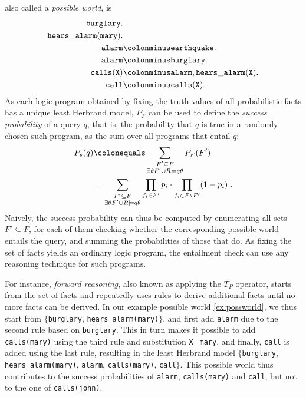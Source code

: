 \documentclass[a4paper]{article}
\begin{document}
also called a \emph{possible world}, is 
\begin{align}
\mathtt{burglary.}&\nonumber\\
\mathtt{hears\_alarm(mary).}& \nonumber\\
\mathtt{alarm}&\colonminus\mathtt{earthquake.}\label{ex:possworld}\\
\mathtt{alarm}&\colonminus\mathtt{burglary.}\nonumber\\
\mathtt{calls(X)}&\colonminus\mathtt{alarm, hears\_alarm(X).}\nonumber\\
\mathtt{call}&\colonminus\mathtt{calls(X).}\nonumber
\end{align}
As each logic program obtained by fixing the truth values of all
probabilistic facts has a unique least Herbrand model, $P_F$ can be
used to define the \emph{success probability} of a query $q$, that is,
the probability that $q$ is true in a randomly chosen such program,
as the sum over all programs that entail $q$:
\begin{align}
\label{eq:p_suc}
P_s(q) &\colonequals \sum\limits_{\substack{F'\subseteq F \\
    \exists\theta F'\cup R\models q\theta}} P_F(F')\\
 &= \sum\limits_{\substack{F'\subseteq F \\
    \exists\theta F'\cup R\models q\theta}} \prod_{f_i\in F'}p_i\cdot\prod_{f_i\in F\setminus F'}(1-p_i)\;.\label{eq:p_suc_facts}
\end{align}
Naively, the success probability can thus be computed by enumerating
all sets $F'\subseteq F$, for each of them checking whether
the corresponding possible world entails the query, and summing the
probabilities of those that do. As fixing the set of facts yields an
ordinary logic program, the entailment check can use any reasoning
technique for such programs.
 
For instance, \emph{forward reasoning}, also
known as applying the $T_P$ operator, starts from the set of
facts and repeatedly uses rules to derive additional facts until no more facts
can be derived. In our example possible world \eqref{ex:possworld}, we thus start 
from $\{$\verb|burglary|, \verb|hears_alarm(mary)|$\}$, and first add \verb|alarm| due to the
second rule based on \verb|burglary|. This in turn makes it possible
to add \verb|calls(mary)| using the third rule and substitution
\verb|X|=\verb|mary|, and finally, \verb|call| is added using the last rule,
resulting in the least Herbrand model $\{$\verb|burglary|,
\verb|hears_alarm(mary)|, \verb|alarm|, \verb|calls(mary)|,
\verb|call|$\}$. This possible world thus contributes to the success
probabilities of \verb|alarm|, \verb|calls(mary)| and \verb|call|, but
not to the one of \verb|calls(john)|. 
\end{document}
